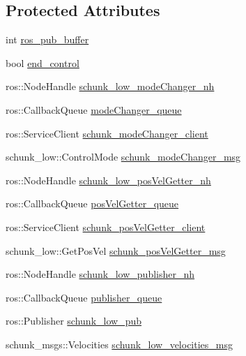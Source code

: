 \subsection*{Protected Attributes}
\begin{DoxyCompactItemize}
\item 
int \hyperlink{classCartesian__controller_ab9ed5a808da204dbc612d313dc7332f4}{ros\-\_\-pub\-\_\-buffer}
\item 
bool \hyperlink{classCartesian__controller_a3c0a72214891f68e2bad63bf2b688f9c}{end\-\_\-control}
\item 
ros\-::\-Node\-Handle \hyperlink{classCartesian__controller_ad90134b232217e84cb58137a9d2030bb}{schunk\-\_\-low\-\_\-mode\-Changer\-\_\-nh}
\item 
ros\-::\-Callback\-Queue \hyperlink{classCartesian__controller_adf47dc3a09bd9650015b25870054b60d}{mode\-Changer\-\_\-queue}
\item 
ros\-::\-Service\-Client \hyperlink{classCartesian__controller_aee1fc445b64c534847ff0012132a5d2c}{schunk\-\_\-mode\-Changer\-\_\-client}
\item 
schunk\-\_\-low\-::\-Control\-Mode \hyperlink{classCartesian__controller_a960d66580ba058d3337c89bdf8099948}{schunk\-\_\-mode\-Changer\-\_\-msg}
\item 
ros\-::\-Node\-Handle \hyperlink{classCartesian__controller_aeed01809bd5240663c7acfade245a386}{schunk\-\_\-low\-\_\-pos\-Vel\-Getter\-\_\-nh}
\item 
ros\-::\-Callback\-Queue \hyperlink{classCartesian__controller_a144c7faad45f3d070624452c1f02ba15}{pos\-Vel\-Getter\-\_\-queue}
\item 
ros\-::\-Service\-Client \hyperlink{classCartesian__controller_a5c1d9386bc5f219f2edc0d5d1b21f0da}{schunk\-\_\-pos\-Vel\-Getter\-\_\-client}
\item 
schunk\-\_\-low\-::\-Get\-Pos\-Vel \hyperlink{classCartesian__controller_ae368dcf84dae528612c617cc92fbb69f}{schunk\-\_\-pos\-Vel\-Getter\-\_\-msg}
\item 
ros\-::\-Node\-Handle \hyperlink{classCartesian__controller_a7df4ce63bf0551bfa7061bc718cd68d2}{schunk\-\_\-low\-\_\-publisher\-\_\-nh}
\item 
ros\-::\-Callback\-Queue \hyperlink{classCartesian__controller_a041a2eb6657c9b036a512fb21e9f5086}{publisher\-\_\-queue}
\item 
ros\-::\-Publisher \hyperlink{classCartesian__controller_aa6ce9cffdd307127ed814d6e5132eba2}{schunk\-\_\-low\-\_\-pub}
\item 
schunk\-\_\-msgs\-::\-Velocities \hyperlink{classCartesian__controller_af59178c57bdd73d9eb474577247bbe40}{schunk\-\_\-low\-\_\-velocities\-\_\-msg}

\end{DoxyCompactItemize}
